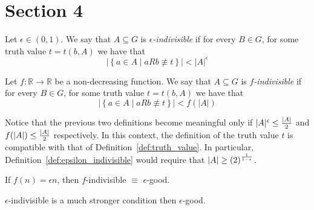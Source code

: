 \section{Section 4} \label{sec:section_4}


    \label{def:epsilon_indivisible}
    Let $\epsilon \in (0,1)$.
    We say that $A \subseteq G$ is \emph{$\epsilon$-indivisible} if for every $B \in G$, for some truth value $t = t(b,A)$ we have that
    \[
    |\left\{ a\in A \mid a R b \not\equiv t \right\}| < |A|^{\epsilon}
    \]

    \label{def:f_indivisible}
    Let $f: \mathbb{R} \longrightarrow \mathbb{R}$ be a non-decreasing function.
    We say that $A \subseteq G$ is \emph{$f$-indivisible} if for every $B \in G$, for some truth value $t = t(b,A)$ we have that
    \[
    |\left\{ a\in A \mid a R b \not\equiv t \right\}| < f(|A|)
    \]

    \remark
    Notice that the previous two definitions become meaningful only if $|A|^{\epsilon} \leq \frac{\left| A \right|}{2}$ and
    $f(|A|) \leq \frac{\left| A \right|}{2}$ respectively.
    In this context, the definition of the truth value $t$ is compatible with that of Definition~\ref{def:truth_value}.
    In particular, Definition~\ref{def:epsilon_indivisible} would require that $\left| A \right| \geq \left( 2 \right)^{\frac{1}{1-\epsilon}}$.

    \remark
    If $f(n) = \epsilon n$, then $f$-indivisible $\equiv$ $\epsilon$-good.

    \remark
    $\epsilon$-indivisible is a much stronger condition then $\epsilon$-good.


